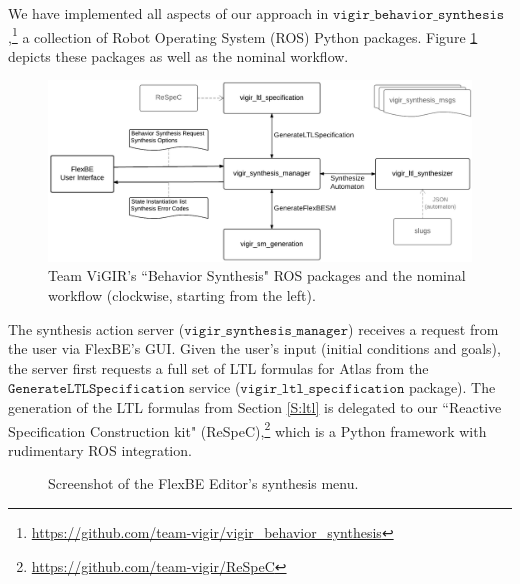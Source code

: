 
We have implemented all aspects of our approach in $\mathtt{vigir\_behavior\_synthesis}$,\footnote{\scriptsize{\url{https://github.com/team-vigir/vigir_behavior_synthesis}}}
 a collection of Robot Operating System (ROS) Python packages.
Figure \ref{Fig:vigir_behavior_synthesis} depicts these packages as well as the nominal workflow.

\begin{figure}[t]
\centering
\includegraphics[width=0.99\columnwidth,clip]{./img/behavior_synthesis_packages.png}
\caption{Team ViGIR's ``Behavior Synthesis" ROS packages and the nominal workflow (clockwise, starting from the left).
}
\label{Fig:vigir_behavior_synthesis}
\end{figure}

The synthesis action server ($\mathtt{vigir\_synthesis\_manager}$) receives a request from the user via FlexBE's GUI.
Given the user's input (initial conditions and goals), the server first requests a full set of LTL formulas for Atlas from the $\mathtt{Generate LTL Specification}$ service ($\mathtt{vigir\_ltl\_specification}$ package).
The generation of the LTL formulas from Section \ref{S:ltl} is delegated to our ``Reactive Specification Construction kit" (ReSpeC),\footnote{\scriptsize{\url{https://github.com/team-vigir/ReSpeC}}}
 which is a Python framework with rudimentary ROS integration.

\begin{figure}[t]
\centering
{}
\caption{Screenshot of the FlexBE Editor's synthesis menu.
}
\label{Fig:SynthesisMenuSimple}
\end{figure}


